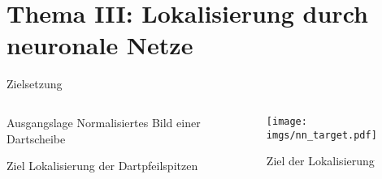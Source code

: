 
\section{Thema III: Lokalisierung durch neuronale Netze}

\begin{frame}{Zielsetzung}
    \begin{columns}
        \begin{column}{0.6\linewidth}

            \begin{block}{Ausgangslage}
                Normalisiertes Bild einer Dartscheibe
            \end{block}

            \begin{block}{Ziel}
                Lokalisierung der Dartpfeilspitzen
            \end{block}

        \end{column}
        \begin{column}{0.4\linewidth}

            \begin{figure}
                \centering
                \texttt{[image: imgs/nn\_target.pdf]}
                \caption{Ziel der Lokalisierung}
            \end{figure}

        \end{column}
    \end{columns}
\end{frame}

